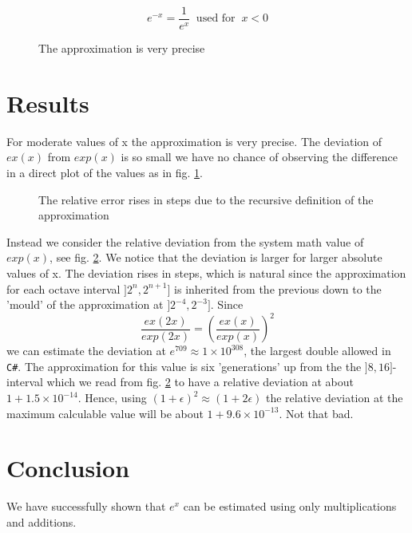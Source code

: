 \documentclass[a4paper]{article}
\begin{document}
\begin{equation}
    \label{eq:regime3}
    e^{-x} = \frac{1}{e^x} \;\; \textrm{used for}\;\;  x < 0
\end{equation}


\begin{figure}
    
    \caption{The approximation is very precise}
    \label{fig:result}
\end{figure}


\section{Results}
For moderate values of x the approximation is very precise. The deviation of $ex(x)$ from $exp(x)$ is so small we have no chance of observing the difference in a direct plot of the values as in fig. \ref{fig:result}.



\begin{figure}
   
    \caption{The relative error rises in steps due to the recursive definition of the approximation}
   \label{fig:result2}
\end{figure}

Instead we consider the relative deviation from the system math value of $exp(x)$, see fig. \ref{fig:result2}. We notice that the deviation is larger for larger absolute values of x. The deviation rises in steps, which is natural since the approximation for each octave interval $]2^{n},2^{n+1}]$ is inherited from the previous down to the 'mould' of the approximation at $]2^{-4},2^{-3}]$. Since
\begin{equation}
    \frac{ex(2x)}{exp(2x)} = \left( \frac{ex(x)}{exp(x)} \right)^2
\end{equation}
we can estimate the deviation at $e^{709} \approx 1 \times 10^{308}$, the largest double allowed in \texttt{C\#}. The approximation for this value is six 'generations' up from the the $]8,16]$-interval which we read from fig. \ref{fig:result2} to have a relative deviation at about $1 + 1.5 \times 10^{-14}$. Hence, using
$(1 + \epsilon)^2 \approx (1 + 2 \epsilon)$ the relative deviation at the maximum calculable value will be about $1 + 9.6 \times 10^{-13}$. Not that bad.




\section{Conclusion}
We have successfully shown that $e^x$ can be estimated using only multiplications and additions. 
\end{document}
